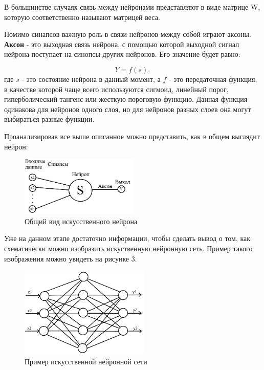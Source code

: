 \documentclass[bachelor, och, coursework]{shiza}
\begin{document}
В большинстве случаях связь между нейронами представляют в виде матрице W, которую соответственно называют матрицей веса.

Помимо синапсов важную роль в связи нейронов между собой играют аксоны. \textbf{Аксон} - это выходная связь нейрона, с помощью которой выходной 
сигнал нейрона поступает на синопсы других нейронов. Его значение будет равно:

\begin{equation}
    Y = f(s),
\end{equation}
где $s$ - это состояние нейрона в данный момент, а $f$ - это передаточная функция, в качестве которой чаще всего используются сигмоид, линейный порог,
гиперболический тангенс или жесткую пороговую функцию. Данная функция одинакова для нейронов одного слоя, но для нейронов разных слоев она могут
выбираться разные функции.

Проанализировав все выше описанное можно представить, как в общем выглядит нейрон:

\begin{figure}[H]
    \centering
    \includegraphics[width=0.5\textwidth]{pic/3}
    \caption{Общий вид искусственного нейрона}
    \label{fig:img1}
\end{figure}

Уже на данном этапе достаточно информации, чтобы сделать вывод о том, как схематически можно изобразить искуственную нейронную сеть. Пример такого
изображения можно увидеть на рисунке 3.

\begin{figure}[H]
    \centering
    \includegraphics[width=0.55\textwidth]{pic/4}
    \caption{Пример искусственной нейронной сети}
    \label{fig:img1}
\end{figure}
\end{document}
